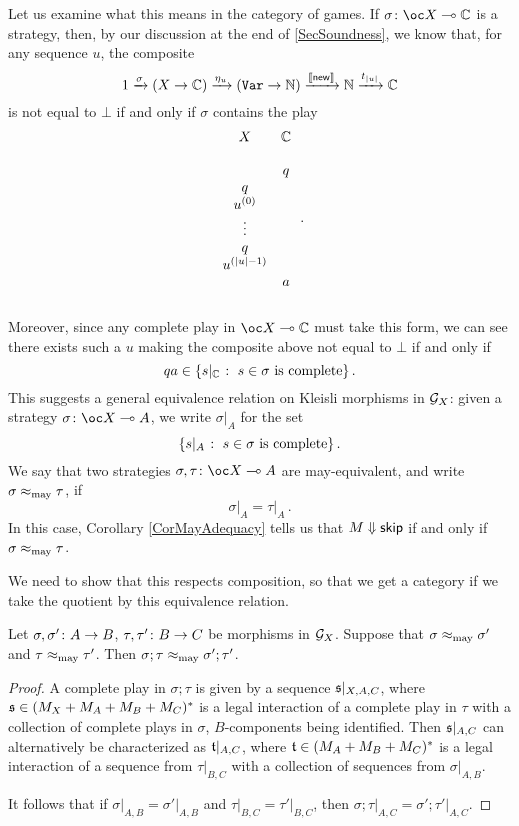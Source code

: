 Let us examine what this means in the category of games.
If $\sigma\from \oc X \implies \bC$ is a strategy, then, by our discussion at the end of \sec\ref{SecSoundness}, we know that, for any sequence $u$, the composite
\[
  1 \xrightarrow{\sigma}
  (X \to \mathbb{C}) \xrightarrow{\eta_u}
  ({\mathtt{Var}} \to \mathbb{N}) \xrightarrow{\left\llbracket\operatorname{{\mathsf{new}}}\right\rrbracket}
  \mathbb{N} \xrightarrow{t_{|u|}}
  \mathbb{C}
  \]
is not equal to $\bot$ if and only if $\sigma$ contains the play
\[
  \begin{array}{cc}
    X         & \mathbb{C} \\
              &     \\
              &  q  \\
    q         &     \\
    u^{(0)}   &     \\
    \vdots    &     \\
    q         &     \\
    u^{(|u|-1)}&     \\
              &  a  \\
              &     \\
  \end{array}\,.
  \]
Moreover, since any complete play in $\oc X \implies \bC$ must take this form, we can see there exists such a $u$ making the composite above not equal to $\bot$ if and only if
\[
  qa \in \{s\vert_{\mathbb{C}} \;\colon\; s\in\sigma\text{ is complete}\}\,.
  \]
This suggests a general equivalence relation on Kleisli morphisms in $\mathcal G_X$: given a strategy $\sigma\from \oc X \implies A$, we write $\sigma\vert_A$ for the set
\[
  \{s\vert_A \;\colon\; s\in \sigma\text{ is complete}\}\,.
  \]
We say that two strategies $\sigma,\tau\from \oc X \implies A$ are may-equivalent, and write $\sigma\approx_{\operatorname{may}}\tau$, if
\[
  \sigma\vert_A = \tau\vert_A\,.
  \]
In this case, Corollary \ref{CorMayAdequacy} tells us that $M\Downarrow {\mathsf{skip}}$ if and only if $\sigma\approx_{\operatorname{may}}\tau$.

We need to show that this respects composition, so that we get a category if we take the quotient by this equivalence relation.
\begin{proposition}
  Let $\sigma,\sigma' \colon A \to B$, $\tau,\tau'\colon B \to C$ be morphisms in $\mathcal G_X$.
  Suppose that $\sigma\approx_{\operatorname{may}}\sigma'$ and $\tau\approx_{\operatorname{may}}\tau'$.  
  Then $\sigma;\tau \approx_{\operatorname{may}} \sigma';\tau'$.
\end{proposition}
\begin{proof}
  A complete play in $\sigma;\tau$ is given by a sequence $\mathfrak s\vert_{X,A,C}$, where $\mathfrak s\in (M_X + M_A + M_B + M_C)^*$ is a legal interaction of a complete play in $\tau$ with a collection of complete plays in $\sigma$, $B$-components being identified.
  Then $\mathfrak s\vert_{A,C}$ can alternatively be characterized as $\mathfrak t\vert_{A,C}$, where $\mathfrak t\in (M_A + M_B + M_C)^*$ is a legal interaction of a sequence from $\tau\vert_{B,C}$ with a collection of sequences from $\sigma\vert_{A,B}$.  

  It follows that if $\sigma\vert_{A,B}=\sigma'\vert_{A,B}$ and $\tau\vert_{B,C}=\tau'\vert_{B,C}$, then $\sigma;\tau\vert_{A,C} = \sigma';\tau'\vert_{A,C}$.
\end{proof}


